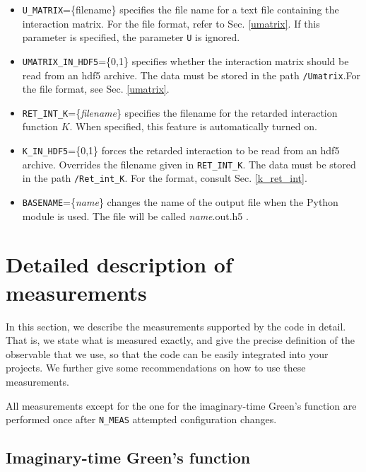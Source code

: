 \documentclass[aps,prb,floatfix,superscriptaddress,twocolumn,notitlepage]{revtex4-1}
\begin{document}
\begin{itemize}
\item\verb#U_MATRIX#=\{filename\} specifies the file name for a text file containing the interaction matrix. For the file format, refer to Sec. \ref{umatrix}. If this parameter is specified, the parameter \verb#U# is ignored.

\item\verb#UMATRIX_IN_HDF5#=\{0,1\} specifies whether the interaction matrix should be read from an hdf5 archive. The data must be stored in the path \verb#/Umatrix#.For the file format, see Sec. \ref{umatrix}.

\item \verb#RET_INT_K#=\{\emph{filename}\} specifies the filename for the retarded interaction function $K$. When specified, this feature is automatically turned on.

\item \verb#K_IN_HDF5#=\{0,1\} forces the retarded interaction to be read from an hdf5 archive. Overrides the filename given in \verb#RET_INT_K#.  The data must be stored in the path \verb#/Ret_int_K#. For the format, consult Sec. \ref{k_ret_int}.

\item \verb#BASENAME#=\{\emph{name}\} changes the name of the output file when the Python module is used. The file will be called \emph{name}.out.h5 .

\end{itemize}

\section{Detailed description of measurements}
\label{measurements}
In this section, we describe the measurements supported by the code in detail. That is, we state what is measured exactly, and give the precise definition of the observable that we use, so that the code can be easily integrated into your projects. We further give some recommendations on how to use these measurements.	

All measurements except for the one for the imaginary-time Green's function are performed once after \verb#N_MEAS# attempted configuration changes.

\subsection{Imaginary-time Green's function}
\label{gtmeas}
\end{document}
